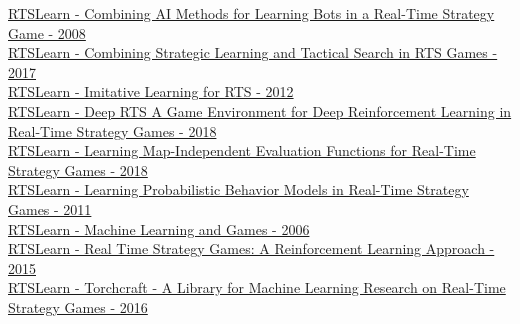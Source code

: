 \href{https://www.hindawi.com/journals/ijcgt/2009/129075/}{RTSLearn - Combining AI Methods for Learning Bots in a Real-Time Strategy Game - 2008}
\\
\href{https://ojs.aaai.org/index.php/AIIDE/article/view/12922}{RTSLearn - Combining Strategic Learning and Tactical Search in RTS Games - 2017}
\\
\href{https://ieeexplore.ieee.org/abstract/document/6374186}{RTSLearn - Imitative Learning for RTS - 2012}
\\
\href{https://ieeexplore.ieee.org/abstract/document/8490409}{RTSLearn - Deep RTS A Game Environment for Deep Reinforcement Learning in Real-Time Strategy Games - 2018}
\\
\href{https://ieeexplore.ieee.org/abstract/document/8490369}{RTSLearn - Learning Map-Independent Evaluation Functions for Real-Time Strategy Games - 2018}
\\
\href{https://ojs.aaai.org/index.php/AIIDE/article/view/12433}{RTSLearn - Learning Probabilistic Behavior Models in Real-Time Strategy Games - 2011}
\\
\href{https://link.springer.com/article/10.1007/s10994-006-8919-x}{RTSLearn - Machine Learning and Games - 2006}
\\
\href{https://www.sciencedirect.com/science/article/pii/S187705091501354X}{RTSLearn - Real Time Strategy Games: A Reinforcement Learning Approach - 2015}
\\
\href{https://arxiv.org/abs/1611.00625}{RTSLearn - Torchcraft - A Library for Machine Learning Research on Real-Time Strategy Games - 2016}
